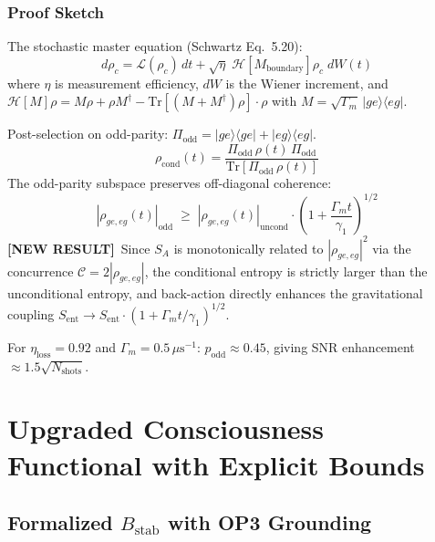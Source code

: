 \documentclass[11pt,letterpaper]{article}
\newcommand{\NEW}{\textcolor{newresult}{\textbf{[NEW RESULT]}}}
\newcommand{\SA}{S_A}
\newcommand{\gamone}{\gamma_1}
\begin{document}
\subsubsection{Proof Sketch}

The stochastic master equation (Schwartz Eq.\ 5.20):
\begin{equation}
  d\rho_c = \mathcal{L}(\rho_c)\,dt + \sqrt{\eta}\;\mathcal{H}[M_{\mathrm{boundary}}]\rho_c\;dW(t)
  \label{eq:SME}
\end{equation}
where $\eta$ is measurement efficiency, $dW$ is the Wiener increment, and $\mathcal{H}[M]\rho = M\rho + \rho M^\dagger - \mathrm{Tr}[(M+M^\dagger)\rho]\cdot\rho$ with $M = \sqrt{\Gamma_m}\,|ge\rangle\langle eg|$.

Post-selection on odd-parity: $\Pi_{\mathrm{odd}} = |ge\rangle\langle ge| + |eg\rangle\langle eg|$.
\begin{equation}
  \rho_{\mathrm{cond}}(t) = \frac{\Pi_{\mathrm{odd}}\,\rho(t)\,\Pi_{\mathrm{odd}}}{\mathrm{Tr}[\Pi_{\mathrm{odd}}\,\rho(t)]}
\end{equation}
The odd-parity subspace preserves off-diagonal coherence:
\begin{equation}
  |\rho_{ge,eg}(t)|_{\mathrm{odd}} \;\geq\; |\rho_{ge,eg}(t)|_{\mathrm{uncond}} \cdot \left(1 + \frac{\Gamma_m t}{\gamone}\right)^{1/2}
\end{equation}
\NEW\ Since $\SA$ is monotonically related to $|\rho_{ge,eg}|^2$ via the concurrence $\mathcal{C} = 2|\rho_{ge,eg}|$, the conditional entropy is strictly larger than the unconditional entropy, and back-action directly enhances the gravitational coupling $S_{\mathrm{ent}} \to S_{\mathrm{ent}}\cdot(1 + \Gamma_m t/\gamone)^{1/2}$.

For $\eta_{\mathrm{loss}} = 0.92$ and $\Gamma_m = 0.5\,\mu\text{s}^{-1}$: $p_{\mathrm{odd}} \approx 0.45$, giving SNR enhancement $\approx 1.5\sqrt{N_{\mathrm{shots}}}$.

\newpage
\section{Upgraded Consciousness Functional with Explicit Bounds}

\subsection{Formalized $B_{\mathrm{stab}}$ with OP3 Grounding}
\end{document}
